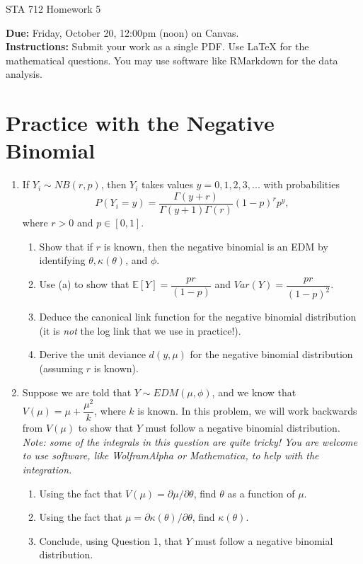 \documentclass[11pt]{article}
\begin{document}
\begin{center}
\Large
STA 712 Homework 5\\
\normalsize
\vspace{5mm}
\end{center}

\noindent \textbf{Due:} Friday, October 20, 12:00pm (noon) on Canvas.\\ 

\noindent \textbf{Instructions:} Submit your work as a single PDF. Use LaTeX for the mathematical questions. You may use software like RMarkdown for the data analysis.

\section*{Practice with the Negative Binomial}

\begin{enumerate}
\item If $Y_i \sim NB(r, p)$, then $Y_i$ takes values $y = 0, 1, 2, 3, ...$ with probabilities
$$P(Y_i = y) = \dfrac{\Gamma(y + r)}{\Gamma(y + 1)\Gamma(r)} (1 - p)^r p^y,$$
where $r > 0$ and $p \in [0,1]$.

\begin{enumerate}
\item Show that if $r$ is known, then the negative binomial is an EDM by identifying $\theta, \kappa(\theta)$, and $\phi$.
\item Use (a) to show that $\mathbb{E}[Y] = \dfrac{pr}{(1-p)}$ and $Var(Y) = \dfrac{p r}{(1 - p)^2}$.
\item Deduce the canonical link function for the negative binomial distribution (it is \textit{not} the log link that we use in practice!).
\item Derive the unit deviance $d(y,\mu)$ for the negative binomial distribution (assuming $r$ is known). 
\end{enumerate}

\item Suppose we are told that $Y \sim EDM(\mu, \phi)$, and we know that $V(\mu) = \mu + \dfrac{\mu^2}{k}$, where $k$ is known. In this problem, we will work backwards from $V(\mu)$ to show that $Y$ must follow a negative binomial distribution. \textit{Note: some of the integrals in this question are quite tricky! You are welcome to use software, like WolframAlpha or Mathematica, to help with the integration.}

\begin{enumerate}
\item Using the fact that $V(\mu) = \partial \mu / \partial \theta$, find $\theta$ as a function of $\mu$.

\item Using the fact that $\mu = \partial \kappa(\theta) / \partial \theta$, find $\kappa(\theta)$.

\item Conclude, using Question 1, that $Y$ must follow a negative binomial distribution.
\end{enumerate}
\end{enumerate}
\end{document}
